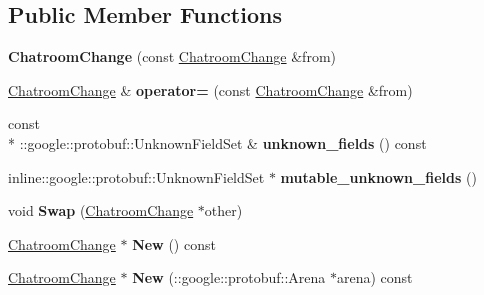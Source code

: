 \subsection*{Public Member Functions}
\begin{DoxyCompactItemize}
\item 
\hypertarget{classSimpleChat_1_1ChatroomChange_abaead93fefe14aa4111dd7e40522ebc9}{{\bfseries Chatroom\-Change} (const \hyperlink{classSimpleChat_1_1ChatroomChange}{Chatroom\-Change} \&from)}\label{classSimpleChat_1_1ChatroomChange_abaead93fefe14aa4111dd7e40522ebc9}

\item 
\hypertarget{classSimpleChat_1_1ChatroomChange_a72f31bff580a7c9362661e5e77ac08ae}{\hyperlink{classSimpleChat_1_1ChatroomChange}{Chatroom\-Change} \& {\bfseries operator=} (const \hyperlink{classSimpleChat_1_1ChatroomChange}{Chatroom\-Change} \&from)}\label{classSimpleChat_1_1ChatroomChange_a72f31bff580a7c9362661e5e77ac08ae}

\item 
\hypertarget{classSimpleChat_1_1ChatroomChange_a0b223a07f61c3e24f31f342e4dd3cba2}{const \\*
\-::google\-::protobuf\-::\-Unknown\-Field\-Set \& {\bfseries unknown\-\_\-fields} () const }\label{classSimpleChat_1_1ChatroomChange_a0b223a07f61c3e24f31f342e4dd3cba2}

\item 
\hypertarget{classSimpleChat_1_1ChatroomChange_a3cd1b332a7d48c4e581efe06596edcb3}{inline\-::google\-::protobuf\-::\-Unknown\-Field\-Set $\ast$ {\bfseries mutable\-\_\-unknown\-\_\-fields} ()}\label{classSimpleChat_1_1ChatroomChange_a3cd1b332a7d48c4e581efe06596edcb3}

\item 
\hypertarget{classSimpleChat_1_1ChatroomChange_a43851d7c9b49cf1e9e9baccba6530b62}{void {\bfseries Swap} (\hyperlink{classSimpleChat_1_1ChatroomChange}{Chatroom\-Change} $\ast$other)}\label{classSimpleChat_1_1ChatroomChange_a43851d7c9b49cf1e9e9baccba6530b62}

\item 
\hypertarget{classSimpleChat_1_1ChatroomChange_adca2bbe6df3f78f3f1235097a7ca9a0b}{\hyperlink{classSimpleChat_1_1ChatroomChange}{Chatroom\-Change} $\ast$ {\bfseries New} () const }\label{classSimpleChat_1_1ChatroomChange_adca2bbe6df3f78f3f1235097a7ca9a0b}

\item 
\hypertarget{classSimpleChat_1_1ChatroomChange_a9de04796e81366af508d61df261b4d6b}{\hyperlink{classSimpleChat_1_1ChatroomChange}{Chatroom\-Change} $\ast$ {\bfseries New} (\-::google\-::protobuf\-::\-Arena $\ast$arena) const }\label{classSimpleChat_1_1ChatroomChange_a9de04796e81366af508d61df261b4d6b}


\end{DoxyCompactItemize}
